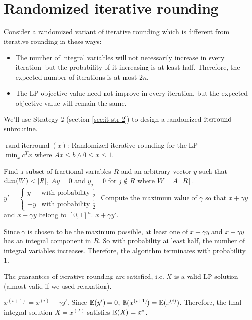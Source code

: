 \section{Randomized iterative rounding}

Consider a randomized variant of iterative rounding which is
different from iterative rounding in these ways:
\begin{itemize}
\item The number of integral variables will not necessarily increase in every iteration,
but the probability of it increasing is at least half.
Therefore, the expected number of iterations is at most $2n$.
\item The LP objective value need not improve in every iteration,
but the expected objective value will remain the same.
\end{itemize}

We'll use Strategy 2 (section \ref{sec:it-str-2}) to design a randomized $\operatorname{iterround}$ subroutine.

\begin{algorithm}[H]
\caption{$\operatorname{rand-iterround}(x)$: Randomized iterative rounding for the LP
${\min_x c^Tx \textrm{ where } Ax \le b \wedge 0 \le x \le 1}$.}
\begin{algorithmic}[1]
\State Find a subset of fractional variables $R$ and an arbitrary vector $y$ such that
$\dim(W) < \left\lvert R \right\rvert$, $Ay = 0$ and $y_j = 0$ for $j \not\in R$ where $W = A[R]$.
\State ${\displaystyle y' = \begin{cases}y & \textrm{with probability }\frac{1}{2}
\\ -y & \textrm{with probability } \frac{1}{2}\end{cases}}$
\State Compute the maximum value of $\gamma$ so that
$x + \gamma y$ and $x - \gamma y$ belong to $[0, 1]^n$.
\State \Return $x + \gamma y'$.
\end{algorithmic}
\end{algorithm}

Since $\gamma$ is chosen to be the maximum possible,
at least one of $x + \gamma y$ and $x - \gamma y$ has an integral component in $R$.
So with probability at least half, the number of integral variables increases.
Therefore, the algorithm terminates with probability 1.

The guarantees of iterative rounding are satisfied,
i.e. $X$ is a valid LP solution (almost-valid if we used relaxation).

$x^{(i+1)} = x^{(i)} + \gamma y'$.
Since $\operatorname{\mathbb{E}}(y') = 0$, $\operatorname{\mathbb{E}}(x^{(i+1)}) = \operatorname{\mathbb{E}}(x^{(i)})$.
Therefore, the final integral solution $X = x^{(T)}$ satisfies $\operatorname{\mathbb{E}}(X) = x^*$.

